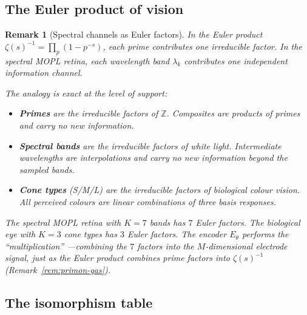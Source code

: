 \documentclass[11pt,a4paper]{article}
\newtheorem{remark}[theorem]{Remark}
\newcommand{\Z}{\mathbb{Z}}
\begin{document}
\subsection{The Euler product of vision}
\label{app:euler-vision}

\begin{remark}[Spectral channels as Euler factors]%
\label{rem:euler-vision}
In the Euler product
$\zeta(s)^{-1} = \prod_p (1 - p^{-s})$,
each prime contributes one irreducible factor.
In the spectral MOPL retina, each wavelength band
$\lambda_k$ contributes one independent information
channel.

The analogy is exact at the level of support:
\begin{itemize}[nosep]
\item \textbf{Primes} are the irreducible factors of $\Z$.
  Composites are products of primes and carry
  no new information.
\item \textbf{Spectral bands} are the irreducible factors
  of white light.
  Intermediate wavelengths are interpolations and carry
  no new information beyond the sampled bands.
\item \textbf{Cone types} (S/M/L) are the irreducible
  factors of biological colour vision.
  All perceived colours are linear combinations
  of three basis responses.
\end{itemize}

The spectral MOPL retina with $K = 7$ bands has
$7$ Euler factors.
The biological eye with $K = 3$ cone types has
$3$ Euler factors.
The encoder $E_\theta$ performs the ``multiplication''
---combining the $7$ factors into the $M$-dimensional
electrode signal, just as the Euler product combines
prime factors into $\zeta(s)^{-1}$
(Remark~\ref{rem:primon-gas}).
\end{remark}

\subsection{The isomorphism table}
\label{app:iso-table}
\end{document}
